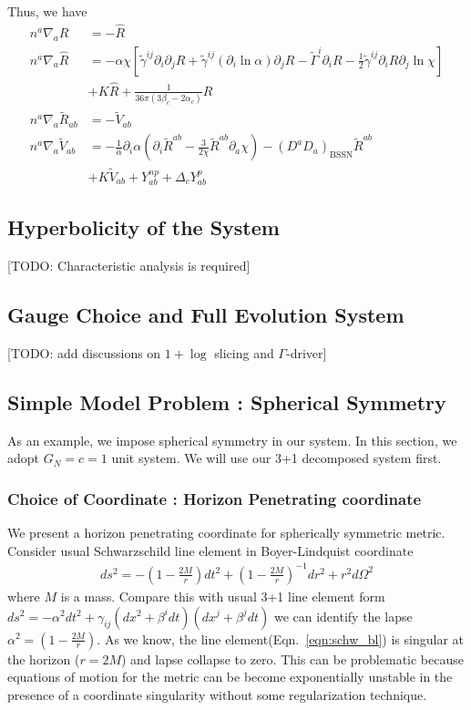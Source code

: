 \documentclass[a4paper,oneside,openany,11pt]{memoir}
\numberwithin{equation}{section} %
\newcommand{\TODO}[1]{{\color{red}[}{\color{red}TODO:} {\color{blue}#1}{\color{red}]}}
\begin{document}
Thus, we have
\begin{align}
n^a \nabla_a R &= - \hat{R}  \\
n^a \nabla_a \hat{R} &= -  \alpha \chi \left[\tilde{\gamma}^{ij} \partial_i \partial_j R + \tilde{\gamma}^{ij} (\partial_i  \ln \alpha) \partial_j R - \tilde{\Gamma}^i \partial_i R - \frac{1}{2} \tilde{\gamma}^{ij} \partial_i R \partial_j \ln \chi \right] \nonumber \\
& + K \hat{R} + \frac{1}{36 \pi (3\beta_c - 2 \alpha_c)} R\\
n^a \nabla_a \tilde{R}_{ab} &= - \tilde{V}_{ab}  \\
n^a \nabla_a \tilde{V}_{ab} &= -  \frac{1}{\alpha} \partial_i \alpha \left(\partial_i \tilde{R}^{ab} - \frac{3}{2\chi} \tilde{R}^{ab} \partial_a \chi \right) - (D^a D_a )_{\textrm{BSSN}} \tilde{R}^{ab} \nonumber \\
& + K \tilde{V}_{ab} + Y^{np}_{ab} + \Delta_c Y^{p}_{ab}
\end{align}


\subsection{Hyperbolicity of the System}
\TODO{Characteristic analysis is required}

\subsection{Gauge Choice and Full Evolution System}
\TODO{add discussions on $1+\log$ slicing and $\Gamma$-driver}

\subsection{Simple Model Problem : Spherical Symmetry}
As an example, we impose spherical symmetry in our system. In this section, we adopt $G_N = c = 1$ unit system.
We will use our 3+1 decomposed system first. 
\subsubsection{Choice of Coordinate : Horizon Penetrating coordinate}
We present a horizon penetrating coordinate for spherically symmetric metric. Consider usual Schwarzschild line element in Boyer-Lindquist coordinate 
\begin{align}
\label{eqn:schw_bl}
ds^2 = - \left(1- \frac{2M}{r} \right) dt^2 + \left(1- \frac{2M}{r} \right)^{-1} dr^2 + r^2 d\Omega^2 
\end{align}
where $M$ is a mass. Compare this with usual 3+1 line element form $ds^2 = - \alpha^2 dt^2 + \gamma_{ij} ( dx^2 + \beta^i dt)(dx^j + \beta^j dt)$ we can identify the lapse $\alpha^2 = \left(1- \frac{2M}{r} \right)$. As we know, the line element(Eqn.~\ref{eqn:schw_bl}) is singular at the horizon ($r=2M$) and lapse collapse to zero. This can be problematic because equations of motion for the metric can be become exponentially unstable in the presence of a coordinate singularity without some regularization technique.
\end{document}
